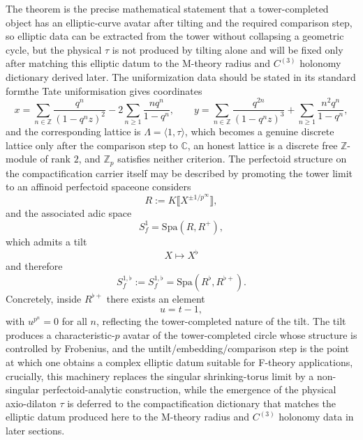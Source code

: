 \documentclass[11pt]{article}
\theoremstyle{remark}
\newcommand{\C}{\mathbb{C}}
\newcommand{\Z}{\mathbb{Z}}
\begin{document}
The theorem is the precise mathematical statement that a tower-completed object has an elliptic-curve avatar after tilting and the required comparison step, so elliptic data can be extracted from the tower without collapsing a geometric cycle, but the physical \(\tau\) is not produced by tilting alone and will be fixed only after matching this elliptic datum to the M-theory radius and \(C^{(3)}\) holonomy dictionary derived later. The uniformization data should be stated in its standard form\:the Tate uniformisation gives coordinates
\begin{equation}\label{27}
x=\sum_{n\in\Z}\frac{q^n}{(1-q^n z)^2}-2\sum_{n\ge 1}\frac{n q^n}{1-q^n},\qquad
y=\sum_{n\in\Z}\frac{q^{2n}}{(1-q^n z)^3}+\sum_{n\ge 1}\frac{n^2 q^n}{1-q^n},
\end{equation}
and the corresponding lattice is \(\Lambda=\langle 1,\tau\rangle\), which becomes a genuine discrete lattice only after the comparison step to \(\C\), an honest lattice is a discrete free \(\Z\)-module of rank \(2\), and \(\Z_p\) satisfies neither criterion. The perfectoid structure on the compactification carrier itself may be described by promoting the tower limit to an affinoid perfectoid space\:one considers
\begin{equation}\label{31}
R:=K\llbracket X^{\pm 1/p^\infty}\rrbracket,
\end{equation}
and the associated adic space
\begin{equation}\label{32}
S_f^1=\mathrm{Spa}(R,R^+),
\end{equation}
which admits a tilt
\begin{equation}\label{33}
X\longmapsto X^\flat
\end{equation}
and therefore
\begin{equation}\label{34}
S_f^{1,\flat}:=S_f^{1,\flat}=\mathrm{Spa}(R^\flat,R^{\flat+}).
\end{equation}
Concretely, inside \(R^{\flat+}\) there exists an element
\begin{equation}\label{35}
u=t-1,
\end{equation}
with \(u^{p^n}=0\) for all \(n\), reflecting the tower-completed nature of the tilt. The tilt produces a characteristic-\(p\) avatar of the tower-completed circle whose structure is controlled by Frobenius, and the untilt/embedding/comparison step is the point at which one obtains a complex elliptic datum suitable for F-theory applications, crucially, this machinery replaces the singular shrinking-torus limit by a non-singular perfectoid-analytic construction, while the emergence of the physical axio-dilaton \(\tau\) is deferred to the compactification dictionary that matches the elliptic datum produced here to the M-theory radius and \(C^{(3)}\) holonomy data in later sections.
\end{document}
